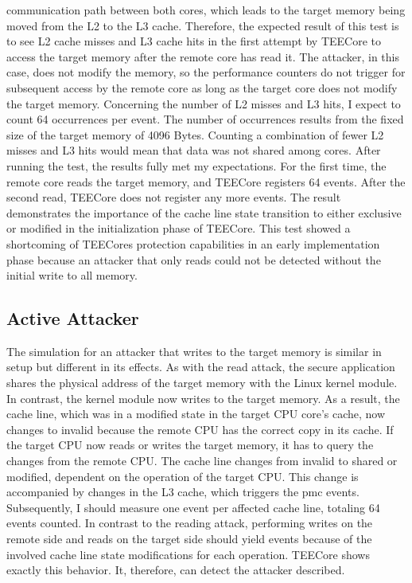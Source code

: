 communication path between both cores, which leads to the target memory
being moved from the L2 to the L3 cache. Therefore, the
expected result of this test is to see L2 cache misses and L3 cache hits in the
first attempt by TEECore to access the target memory after the remote core has
read it. The attacker, in this case, does not modify the memory, so the
performance counters do not trigger for subsequent access by the remote core as
long as the target core does not modify the target memory. Concerning the number
of L2 misses and L3 hits, I expect to count 64 occurrences per event. The number
of occurrences results from the fixed size of the target memory of 4096 Bytes.
Counting a combination of fewer L2 misses and L3 hits would mean that data was
not shared among cores. After running the test, the results fully met my
expectations. For the first time, the remote core reads the target memory, and
TEECore registers 64 events. After the second read, TEECore does not register
any more events. The result demonstrates the importance of the cache line state
transition to either exclusive or modified in the initialization phase of
TEECore. This test showed a shortcoming of TEECores protection capabilities in
an early implementation phase because an attacker that only reads could not be
detected without the initial write to all memory.\\

\subsection{Active Attacker}
\label{sec:evaluation:active}
The simulation for an attacker that writes to the target memory is similar in
setup but different in its effects. As with the read attack, the secure
application shares the physical address of the target memory with the Linux
kernel module. In contrast, the kernel module now writes to the target memory.
As a result, the cache line, which was in a modified state in the target CPU
core's cache, now changes to invalid because the remote CPU has the correct copy
in its cache. If the target CPU now reads or writes the target memory, it has to
query the changes from the remote CPU. The cache line changes from invalid to
shared or modified, dependent on the operation of the target CPU. This change is
accompanied by changes in the L3 cache, which triggers the \gls{pmc} events.
Subsequently, I should measure one event per affected cache line, totaling 64
events counted. In contrast to the reading attack, performing writes on the
remote side and reads on the target side should yield events because of the
involved cache line state modifications for each operation. TEECore shows
exactly this behavior. It, therefore, can detect the attacker described.\\

